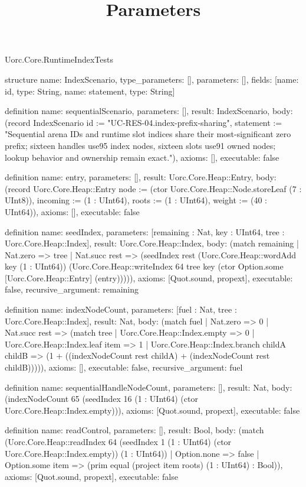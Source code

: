 \begin{lexlean}{Uorc.Core.RuntimeIndexTests}
\title{Parameters}
\begin{semanticmodule}
structure{
  name: IndexScenario,
  type_parameters: [],
  parameters: [],
  fields: [{name: id, type: String}, {name: statement, type: String}]
}

definition{
  name: sequentialScenario,
  parameters: [],
  result: IndexScenario,
  body: (record IndexScenario {id := "UC-RES-04.index-prefix-sharing", statement := "Sequential arena IDs and runtime slot indices share their most-significant zero prefix; sixteen handles use95 index nodes, sixteen slots use91 owned nodes; lookup behavior and ownership remain exact."}),
  axioms: [],
  executable: false
}

definition{
  name: entry,
  parameters: [],
  result: Uorc.Core.Heap::Entry,
  body: (record Uorc.Core.Heap::Entry {node := (ctor Uorc.Core.Heap::Node.storeLeaf (7 : UInt8)), incoming := (1 : UInt64), roots := (1 : UInt64), weight := (40 : UInt64)}),
  axioms: [],
  executable: false
}

definition{
  name: seedIndex,
  parameters: [remaining : Nat, key : UInt64, tree : Uorc.Core.Heap::Index],
  result: Uorc.Core.Heap::Index,
  body: (match remaining
    | Nat.zero => tree
    | Nat.succ rest => (seedIndex rest (Uorc.Core.Heap::wordAdd key (1 : UInt64)) (Uorc.Core.Heap::writeIndex 64 tree key (ctor Option.some [Uorc.Core.Heap::Entry] (entry))))),
  axioms: [Quot.sound, propext],
  executable: false,
  recursive_argument: remaining
}

definition{
  name: indexNodeCount,
  parameters: [fuel : Nat, tree : Uorc.Core.Heap::Index],
  result: Nat,
  body: (match fuel
    | Nat.zero => 0
    | Nat.succ rest => (match tree
      | Uorc.Core.Heap::Index.empty => 0
      | Uorc.Core.Heap::Index.leaf item => 1
      | Uorc.Core.Heap::Index.branch childA childB => (1 + ((indexNodeCount rest childA) + (indexNodeCount rest childB))))),
  axioms: [],
  executable: false,
  recursive_argument: fuel
}

definition{
  name: sequentialHandleNodeCount,
  parameters: [],
  result: Nat,
  body: (indexNodeCount 65 (seedIndex 16 (1 : UInt64) (ctor Uorc.Core.Heap::Index.empty))),
  axioms: [Quot.sound, propext],
  executable: false
}

definition{
  name: readControl,
  parameters: [],
  result: Bool,
  body: (match (Uorc.Core.Heap::readIndex 64 (seedIndex 1 (1 : UInt64) (ctor Uorc.Core.Heap::Index.empty)) (1 : UInt64))
    | Option.none => false
    | Option.some item => (prim equal (project item roots) (1 : UInt64) : Bool)),
  axioms: [Quot.sound, propext],
  executable: false
}


\end{semanticmodule}
\end{lexlean}
